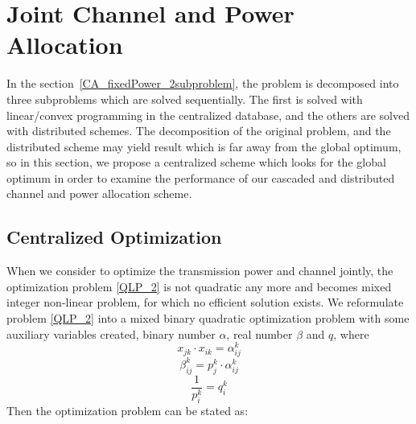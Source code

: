 \section{Joint Channel and Power Allocation}
In the section~\ref{CA_fixedPower_2subproblem}, the problem is decomposed into three subproblems which are solved sequentially.
The first is solved with linear/convex programming in the centralized database, and the others are solved with distributed schemes.
The decomposition of the original problem, and the distributed scheme may yield result which is far away from the global optimum, so in this section, we propose a centralized scheme which looks for the global optimum in order to examine the performance of our cascaded and distributed channel and power allocation scheme.


\subsection{Centralized Optimization}
\label{opt_channelAndPower}
When we consider to optimize the transmission power and channel jointly, the optimization problem \ref{QLP_2} is not quadratic any more and becomes mixed integer non-linear problem, for which no efficient solution exists.
We reformulate problem \ref{QLP_2} into a mixed binary quadratic optimization problem with some auxiliary variables created, \ie binary number $\alpha$, real number $\beta$ and $q$, where
	\begin{equation}
	\label{alpha_opt}
x_{jk}\cdot x_{ik} =\alpha_{ij}^k
	\end{equation}
	\begin{equation}
	\label{beta_opt}
\beta_{ij}^k = p_j^k\cdot \alpha_{ij}^k
	\end{equation}
	\begin{equation}
	\label{q_opt}	
\frac{1}{p_i^k} = q_i^k
	\end{equation}
Then the optimization problem can be stated as:
